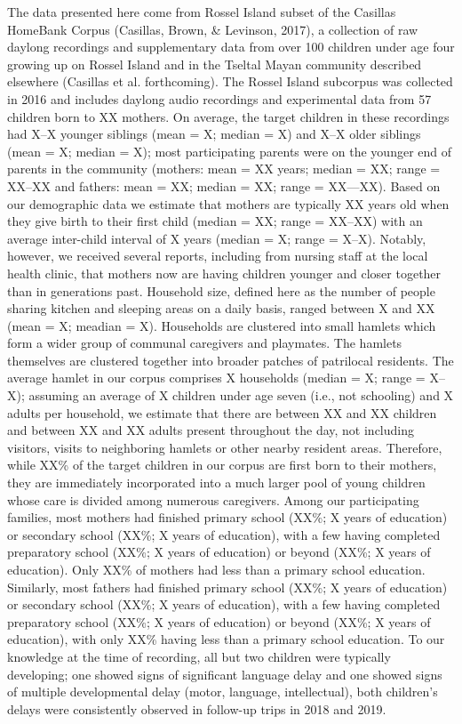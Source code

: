 \documentclass[,man,floatsintext]{apa6}
\begin{document}
The data presented here come from Rossel Island subset of the Casillas
HomeBank Corpus (Casillas, Brown, \& Levinson, 2017), a collection of
raw daylong recordings and supplementary data from over 100 children
under age four growing up on Rossel Island and in the Tseltal Mayan
community described elsewhere (Casillas et al. forthcoming). The Rossel
Island subcorpus was collected in 2016 and includes daylong audio
recordings and experimental data from 57 children born to XX mothers. On
average, the target children in these recordings had X--X younger
siblings (mean = X; median = X) and X--X older siblings (mean = X;
median = X); most participating parents were on the younger end of
parents in the community (mothers: mean = XX years; median = XX; range =
XX--XX and fathers: mean = XX; median = XX; range = XX---XX). Based on
our demographic data we estimate that mothers are typically XX years old
when they give birth to their first child (median = XX; range = XX--XX)
with an average inter-child interval of X years (median = X; range =
X--X). Notably, however, we received several reports, including from
nursing staff at the local health clinic, that mothers now are having
children younger and closer together than in generations past. Household
size, defined here as the number of people sharing kitchen and sleeping
areas on a daily basis, ranged between X and XX (mean = X; meadian = X).
Households are clustered into small hamlets which form a wider group of
communal caregivers and playmates. The hamlets themselves are clustered
together into broader patches of patrilocal residents. The average
hamlet in our corpus comprises X households (median = X; range = X--X);
assuming an average of X children under age seven (i.e., not schooling)
and X adults per household, we estimate that there are between XX and XX
children and between XX and XX adults present throughout the day, not
including visitors, visits to neighboring hamlets or other nearby
resident areas. Therefore, while XX\% of the target children in our
corpus are first born to their mothers, they are immediately
incorporated into a much larger pool of young children whose care is
divided among numerous caregivers. Among our participating families,
most mothers had finished primary school (XX\%; X years of education) or
secondary school (XX\%; X years of education), with a few having
completed preparatory school (XX\%; X years of education) or beyond
(XX\%; X years of education). Only XX\% of mothers had less than a
primary school education. Similarly, most fathers had finished primary
school (XX\%; X years of education) or secondary school (XX\%; X years
of education), with a few having completed preparatory school (XX\%; X
years of education) or beyond (XX\%; X years of education), with only
XX\% having less than a primary school education. To our knowledge at
the time of recording, all but two children were typically developing;
one showed signs of significant language delay and one showed signs of
multiple developmental delay (motor, language, intellectual), both
children's delays were consistently observed in follow-up trips in 2018
and 2019.
\end{document}
